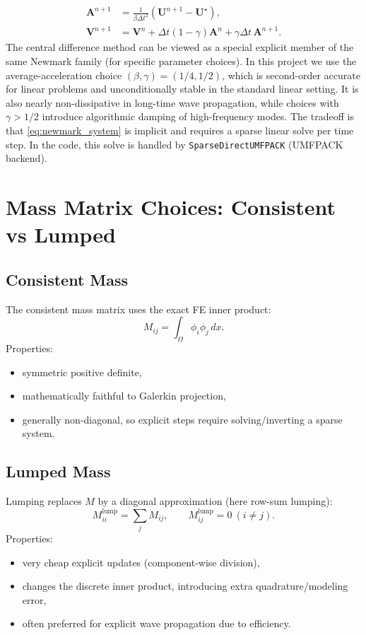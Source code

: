 \documentclass[11pt,a4paper]{report}
\begin{document}
\begin{align}
\bm A^{n+1} &= \frac{1}{\beta\Delta t^2}\left(\bm U^{n+1}-\bm U^\star\right),\\
\bm V^{n+1} &= \bm V^n + \Delta t(1-\gamma)\bm A^n + \gamma\Delta t\,\bm A^{n+1}.
\end{align}
The central difference method can be viewed as a special explicit member of the
same Newmark family (for specific parameter choices). In this project we use
the average-acceleration choice $(\beta,\gamma)=(1/4,1/2)$, which is
second-order accurate for linear problems and unconditionally stable in the
standard linear setting. It is also nearly non-dissipative in long-time wave
propagation, while choices with $\gamma>1/2$ introduce algorithmic damping of
high-frequency modes. The tradeoff is that \eqref{eq:newmark_system} is
implicit and requires a sparse linear solve per time step. In the code, this
solve is handled by \texttt{SparseDirectUMFPACK} (UMFPACK backend).

\chapter{Mass Matrix Choices: Consistent vs Lumped}
\section{Consistent Mass}
The consistent mass matrix uses the exact FE inner product:
\[
M_{ij}=\int_\Omega\phi_i\phi_j\,dx.
\]
Properties:
\begin{itemize}
  \item symmetric positive definite,
  \item mathematically faithful to Galerkin projection,
  \item generally non-diagonal, so explicit steps require solving/inverting a sparse system.
\end{itemize}

\section{Lumped Mass}
Lumping replaces $M$ by a diagonal approximation (here row-sum lumping):
\[
M^{\text{lump}}_{ii}=\sum_j M_{ij},\qquad M^{\text{lump}}_{ij}=0\ (i\neq j).
\]
Properties:
\begin{itemize}
  \item very cheap explicit updates (component-wise division),
  \item changes the discrete inner product, introducing extra quadrature/modeling error,
  \item often preferred for explicit wave propagation due to efficiency.
\end{itemize}
\end{document}
